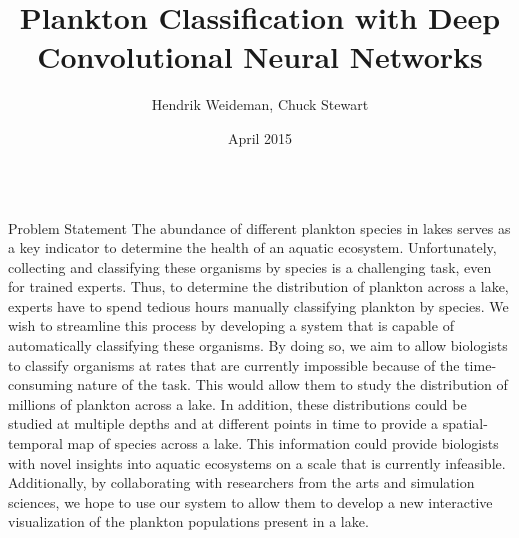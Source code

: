 \documentclass[final,hyperref={pdfpagelabels=false}]{beamer}
\title{\huge Plankton Classification with Deep Convolutional Neural Networks}
\author{Hendrik Weideman, Chuck Stewart}
\institute{Department of Computer Science\\Rensselaer Polytechnic Institute}
\date[April 2015]{April 2015}
\begin{document}
\begin{frame}
  \begin{columns}[T]
  	\begin{column}{.32\textwidth}
      \begin{block}{Problem Statement}
        The abundance of different plankton species in lakes serves as a key indicator to determine the health of an aquatic ecosystem.
        Unfortunately, collecting and classifying these organisms by species is a challenging task, even for trained experts.  Thus,
        to determine the distribution of plankton across a lake, experts have to spend tedious hours manually classifying plankton by
        species.  We wish to streamline this process by developing a system that is capable of automatically classifying these organisms.
        By doing so, we aim to allow biologists to classify organisms at rates that are currently impossible because of the
        time-consuming nature of the task.  This would allow them to study the distribution of millions of plankton across a lake.  In
        addition, these distributions could be studied at multiple depths and at different points in time to provide a spatial-temporal
        map of species across a lake.  This information could provide biologists with novel insights into aquatic ecosystems on a scale
        that is currently infeasible.  Additionally, by collaborating with researchers from the arts and simulation sciences, we hope to
        use our system to allow them to develop a new interactive visualization of the plankton populations present in a lake.
      \end{block}


\end{column}
\end{columns}
\end{frame}
\end{document}
